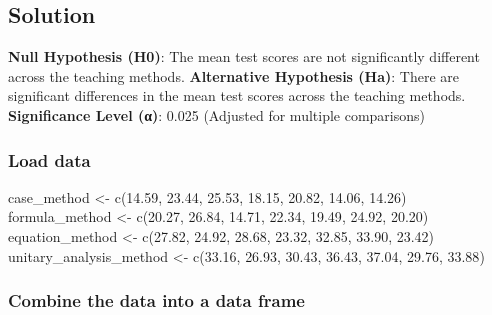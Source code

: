 \documentclass[
]{article}
\newenvironment{Shaded}{\begin{snugshade}}{\end{snugshade}}
\newcommand{\FloatTok}[1]{\textcolor[rgb]{0.00,0.00,0.81}{#1}}
\newcommand{\FunctionTok}[1]{\textcolor[rgb]{0.00,0.00,0.00}{#1}}
\newcommand{\NormalTok}[1]{#1}
\newcommand{\OtherTok}[1]{\textcolor[rgb]{0.56,0.35,0.01}{#1}}
\begin{document}
\hypertarget{solution}{%
\subsection{Solution}\label{solution}}

\textbf{Null Hypothesis (H0)}: The mean test scores are not
significantly different across the teaching methods. \textbf{Alternative
Hypothesis (Ha)}: There are significant differences in the mean test
scores across the teaching methods. \textbf{Significance Level (α)}:
0.025 (Adjusted for multiple comparisons)

\hypertarget{load-data}{%
\subsubsection{Load data}\label{load-data}}

\begin{Shaded}
\begin{Highlighting}[]
\NormalTok{case\_method }\OtherTok{\textless{}{-}} \FunctionTok{c}\NormalTok{(}\FloatTok{14.59}\NormalTok{, }\FloatTok{23.44}\NormalTok{, }\FloatTok{25.53}\NormalTok{, }\FloatTok{18.15}\NormalTok{, }\FloatTok{20.82}\NormalTok{, }\FloatTok{14.06}\NormalTok{, }\FloatTok{14.26}\NormalTok{)}
\NormalTok{formula\_method }\OtherTok{\textless{}{-}} \FunctionTok{c}\NormalTok{(}\FloatTok{20.27}\NormalTok{, }\FloatTok{26.84}\NormalTok{, }\FloatTok{14.71}\NormalTok{, }\FloatTok{22.34}\NormalTok{, }\FloatTok{19.49}\NormalTok{, }\FloatTok{24.92}\NormalTok{, }\FloatTok{20.20}\NormalTok{)}
\NormalTok{equation\_method }\OtherTok{\textless{}{-}} \FunctionTok{c}\NormalTok{(}\FloatTok{27.82}\NormalTok{, }\FloatTok{24.92}\NormalTok{, }\FloatTok{28.68}\NormalTok{, }\FloatTok{23.32}\NormalTok{, }\FloatTok{32.85}\NormalTok{, }\FloatTok{33.90}\NormalTok{, }\FloatTok{23.42}\NormalTok{)}
\NormalTok{unitary\_analysis\_method }\OtherTok{\textless{}{-}} \FunctionTok{c}\NormalTok{(}\FloatTok{33.16}\NormalTok{, }\FloatTok{26.93}\NormalTok{, }\FloatTok{30.43}\NormalTok{, }\FloatTok{36.43}\NormalTok{, }\FloatTok{37.04}\NormalTok{, }\FloatTok{29.76}\NormalTok{, }\FloatTok{33.88}\NormalTok{)}
\end{Highlighting}
\end{Shaded}

\hypertarget{combine-the-data-into-a-data-frame}{%
\subsubsection{Combine the data into a data
frame}\label{combine-the-data-into-a-data-frame}}
\end{document}
